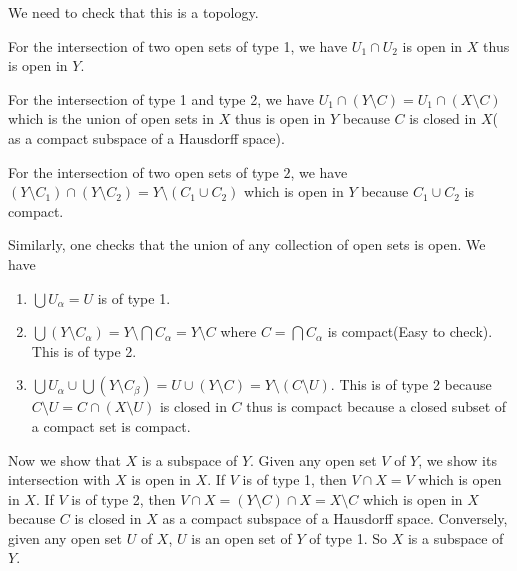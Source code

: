 \documentclass[main.tex]{subfiles}
\begin{document}
We need to check that this is a topology. 
\par For the intersection of two open sets of type 1, we have $U_1 \cap U_2$ is open in $X$ thus is open in $Y$. 
\par For the intersection of type 1 and type 2, we have $U_1 \cap (Y \setminus C) = U_1\cap(X \setminus C)$ which is the union of open sets in $X$ thus is open in $Y$ because $C$ is closed in $X$( as a compact subspace of a Hausdorff space). 
\par For the intersection of two open sets of type $2$, we have $(Y \setminus C_1) \cap (Y \setminus C_2) = Y \setminus (C_1 \cup C_2)$ which is open in $Y$ because $C_1 \cup C_2$ is compact. 
\par Similarly, one checks that the union of any collection of open sets is open. We have 
\begin{enumerate}
    \item $\bigcup U_{\alpha} = U$ is of type 1. 
    \item $\bigcup (Y \setminus C_{\alpha}) = Y \setminus \bigcap C_{\alpha} = Y \setminus C$ where $C = \bigcap C_{\alpha}$ is compact(Easy to check). This is of type 2. 
    \item $\bigcup U_{\alpha} \cup \bigcup (Y \setminus C_{\beta}) = U \cup (Y \setminus C) = Y \setminus (C \setminus U)$. This is of type 2 because $C \setminus U = C \cap (X \setminus U)$ is closed in $C$ thus is compact because a closed subset of a compact set is compact.
\end{enumerate}
\par Now we show that $X$ is a subspace of $Y$. Given any open set $V$ of $Y$, we show its intersection with $X$ is open in $X$. If $V$ is of type 1, then $V \cap X = V$ which is open in $X$. If $V$ is of type 2, then $V \cap X = (Y \setminus C) \cap X = X \setminus C$ which is open in $X$ because $C$ is closed in $X$ as a compact subspace of a Hausdorff space. Conversely, given any open set $U$ of $X$, $U$ is an open set of $Y$ of type 1. So $X$ is a subspace of $Y$. 
\end{document}
